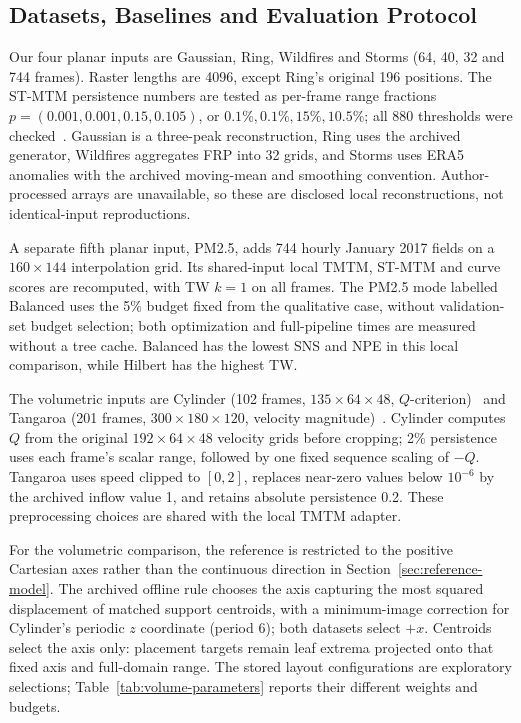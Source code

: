 \documentclass[review]{vgtc}
\begin{document}
\subsection{Datasets, Baselines and Evaluation Protocol}
Our four planar inputs are Gaussian, Ring, Wildfires and Storms (64, 40, 32 and 744 frames). Raster lengths are 4096, except Ring's original 196 positions. The ST-MTM persistence numbers are tested as per-frame range fractions $p=(0.001,0.001,0.15,0.105)$, or $0.1\%,0.1\%,15\%,10.5\%$; all 880 thresholds were checked~\cite{STMTM:2026}. Gaussian is a three-peak reconstruction, Ring uses the archived generator, Wildfires aggregates FRP into 32 grids, and Storms uses ERA5 anomalies with the archived moving-mean and smoothing convention. Author-processed arrays are unavailable, so these are disclosed local reconstructions, not identical-input reproductions.

A separate fifth planar input, PM2.5, adds 744 hourly January 2017 fields on a $160\times144$ interpolation grid. Its shared-input local TMTM, ST-MTM and curve scores are recomputed, with TW $k=1$ on all frames. The PM2.5 mode labelled Balanced uses the 5\% budget fixed from the qualitative case, without validation-set budget selection; both optimization and full-pipeline times are measured without a tree cache. Balanced has the lowest SNS and NPE in this local comparison, while Hilbert has the highest TW.

The volumetric inputs are Cylinder (102 frames, $135\times64\times48$, $Q$-criterion)~\cite{Camarri:2005:Cylinder,Weinkauf:SquareCylinder} and Tangaroa (201 frames, $300\times180\times120$, velocity magnitude)~\cite{Popinet:2004:Tangaroa}. Cylinder computes $Q$ from the original $192\times64\times48$ velocity grids before cropping; 2\% persistence uses each frame's scalar range, followed by one fixed sequence scaling of $-Q$. Tangaroa uses speed clipped to $[0,2]$, replaces near-zero values below $10^{-6}$ by the archived inflow value 1, and retains absolute persistence 0.2. These preprocessing choices are shared with the local TMTM adapter. 

For the volumetric comparison, the reference is restricted to the positive Cartesian axes rather than the continuous direction in Section~\ref{sec:reference-model}. The archived offline rule chooses the axis capturing the most squared displacement of matched support centroids, with a minimum-image correction for Cylinder's periodic $z$ coordinate (period 6); both datasets select $+x$. Centroids select the axis only: placement targets remain leaf extrema projected onto that fixed axis and full-domain range. The stored layout configurations are exploratory selections; Table~\ref{tab:volume-parameters} reports their different weights and budgets. 
\end{document}
